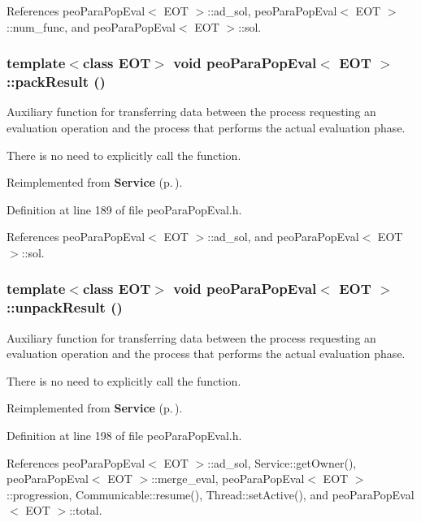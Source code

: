 References peo\-Para\-Pop\-Eval$<$ EOT $>$::ad\_\-sol, peo\-Para\-Pop\-Eval$<$ EOT $>$::num\_\-func, and peo\-Para\-Pop\-Eval$<$ EOT $>$::sol.
\subsubsection{\setlength{\rightskip}{0pt plus 5cm}template$<$class EOT$>$ void {\bf peo\-Para\-Pop\-Eval}$<$ EOT $>$::pack\-Result ()\hspace{0.3cm}{\tt  [virtual]}}\label{classpeo_para_pop_eval_24bb4ae84b0b9f64e7170e3d2b0e1223}


Auxiliary function for transferring data between the process requesting an evaluation operation and the process that performs the actual evaluation phase. 

There is no need to explicitly call the function. 

Reimplemented from {\bf Service} {\rm (p.\,\pageref{class_service_e5e4f90b2315e15c2a2913bd370f4cf5})}.

Definition at line 189 of file peo\-Para\-Pop\-Eval.h.

References peo\-Para\-Pop\-Eval$<$ EOT $>$::ad\_\-sol, and peo\-Para\-Pop\-Eval$<$ EOT $>$::sol.
\subsubsection{\setlength{\rightskip}{0pt plus 5cm}template$<$class EOT$>$ void {\bf peo\-Para\-Pop\-Eval}$<$ EOT $>$::unpack\-Result ()\hspace{0.3cm}{\tt  [virtual]}}\label{classpeo_para_pop_eval_fd7f0afe9cba30be39269d16097e190e}


Auxiliary function for transferring data between the process requesting an evaluation operation and the process that performs the actual evaluation phase. 

There is no need to explicitly call the function. 

Reimplemented from {\bf Service} {\rm (p.\,\pageref{class_service_45c06344edbfa482b91f68e2035a6099})}.

Definition at line 198 of file peo\-Para\-Pop\-Eval.h.

References peo\-Para\-Pop\-Eval$<$ EOT $>$::ad\_\-sol, Service::get\-Owner(), peo\-Para\-Pop\-Eval$<$ EOT $>$::merge\_\-eval, peo\-Para\-Pop\-Eval$<$ EOT $>$::progression, Communicable::resume(), Thread::set\-Active(), and peo\-Para\-Pop\-Eval$<$ EOT $>$::total.
